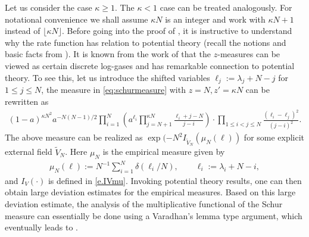 \documentclass[reqno,11pt]{amsart}
\numberwithin{equation}{section}
\theoremstyle{definition}
\begin{document}
Let us consider the case $\kappa\ge 1$. The $\kappa<1$ case can be treated analogously. For notational convenience we shall assume $\kappa N$ is an integer and work with $\kappa N+1$ instead of $\lfloor \kappa N \rfloor$. Before going into the proof of , it is instructive to understand why the rate function has relation to potential theory (recall the notions and basic facts from ). It is known from the work of \cite{johansson2000shape} that the $z$-measures can be viewed as certain discrete log-gases and has remarkable connection to potential theory. To see this, let us introduce the shifted variables $\ell_j:=\lambda_j+N-j$ for $1\leq j\leq N$, the measure in \eqref{eq:schurmeasure} with $z=N, z'=\kappa N$ can be rewritten as 
\begin{equation}\label{zmeas}
\begin{aligned}
   (1-a)^{\kappa N^2}a^{-N(N-1)/2} \prod_{i=1}^{N}\left(a^{\ell_i}\prod_{j=N+1}^{\kappa N}\frac{\ell_i+j-N}{j-i}\right)\cdot \prod_{1\leq i<j\leq N}\frac{(\ell_i-\ell_j)^2}{(j-i)^2}.
    \end{aligned}
\end{equation}
The above measure can be realized as $\exp(-N^2 I_{\widetilde{V}_N}(\mu_N(\ell))$ for some explicit external field $\widetilde{V}_N$. Here $\mu_N$ is the empirical measure given by
\begin{align*}
    \mu_N(\ell):=N^{-1}\sum_{i=1}^{N} \delta(\ell_i/N), \qquad \ell_i:=\lambda_i+N-i,
\end{align*}
and $I_V(\cdot)$ is defined in \eqref{e.IVmu}.
Invoking potential theory results, one can then obtain large deviation estimates for the empirical measures. Based on this large deviation estimate, the analysis of the multiplicative functional of the Schur measure can essentially be done using a Varadhan's lemma type argument, which eventually leads to .
\end{document}
